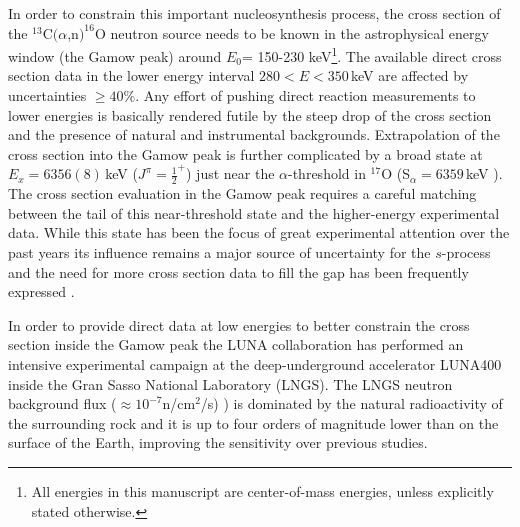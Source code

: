 \documentclass[%
reprint,
groupedaddress,
showpacs,
nofootinbib,
amsmath,amssymb,
aps,
prl,
superscriptaddress,
notitlepage,
floatfix
]{revtex4-2}
\begin{document}
In order to constrain this important nucleosynthesis process, the cross section of the $^{13}$C$(\alpha$,n$)^{16}$O neutron source needs to be known in the astrophysical energy window (the Gamow peak) around $E_{0}$= 150-230 keV\footnote{All energies in this manuscript are center-of-mass energies, unless explicitly stated otherwise.}.
The available direct cross section data in the lower energy interval $280<E<350$\,keV  \cite{Drotleff:1993,Heil:2008a} are affected by uncertainties $\geq 40\%$.
Any effort of pushing direct reaction measurements to lower energies is basically rendered futile by the steep drop of the cross section and the presence of natural and instrumental backgrounds.
Extrapolation of the cross section into the Gamow peak is further complicated by a broad state at $E_{x} = 6356 (8)$\,keV ($J^{\pi}=\frac{1}{2}^{+}$) just near the $\alpha$-threshold in $^{17}$O (S$_{\alpha} = 6359$\,keV \cite{Tilley1993}).
The cross section evaluation in the Gamow peak requires a careful matching between the tail of this near-threshold state and the higher-energy experimental data.
While this state has been the focus of great experimental attention over the past years \cite{Kubono2003,Johnson2006,Avila2015,Trippella2017,Keeley2018} its influence remains a major source of uncertainty for the $s$-process \cite{DeBoer:2020} and the need for more cross section data to fill the gap has been  frequently expressed \cite{Cristallo:2018, DeBoer:2020}.

In order to provide direct data at low energies to better constrain the cross section inside the Gamow peak the LUNA collaboration has performed an intensive experimental campaign at the deep-underground accelerator LUNA400 \cite{Formicola:2003} inside the Gran Sasso National Laboratory (LNGS).
The LNGS neutron background flux ($\approx 10^{-7}$n/cm$^2$/s) \cite{Best:2016}) is dominated by the natural radioactivity of the surrounding rock and it is up to four orders of magnitude lower than on the surface of the Earth, improving the sensitivity over previous studies.
\end{document}
